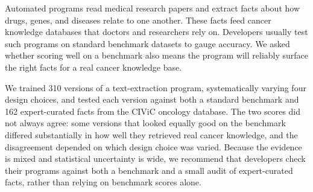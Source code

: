 
Automated programs read medical research papers and extract facts
about how drugs, genes, and diseases relate to one another. These
facts feed cancer knowledge databases that doctors and researchers
rely on. Developers usually test such programs on standard benchmark
datasets to gauge accuracy. We asked whether scoring well on a
benchmark also means the program will reliably surface the right
facts for a real cancer knowledge base.

We trained 310 versions of a text-extraction program, systematically
varying four design choices, and tested each version against both a
standard benchmark and 162 expert-curated facts from the CIViC
oncology database. The two scores did not always agree: some
versions that looked equally good on the benchmark differed
substantially in how well they retrieved real cancer knowledge,
and the disagreement depended on which design choice was varied.
Because the evidence is mixed and statistical uncertainty is wide,
we recommend that developers check their programs against both a
benchmark and a small audit of expert-curated facts, rather than
relying on benchmark scores alone.
